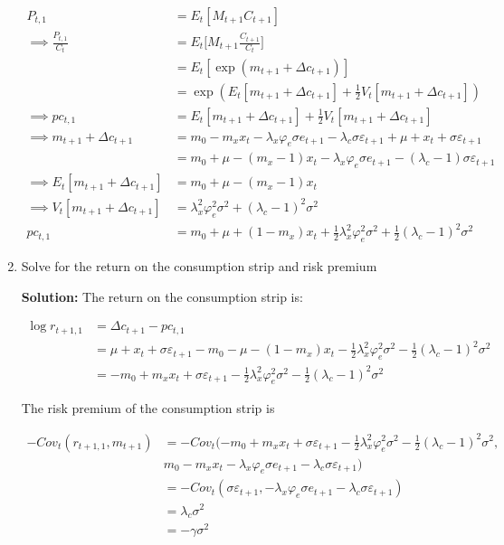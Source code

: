 \documentclass{article}
\begin{document}
\begin{enumerate}
\begin{align*}
P_{t,1} &= E_t[M_{t+1} C_{t+1}]\\
\implies
\frac{P_{t,1}}{C_t} &= E_t \Bigg[M_{t+1} \frac{C_{t+1}}{C_t} \Bigg]\\
&= E_t [\exp(m_{t+1} + \Delta c_{t+1} ) ]\\
&= \exp(E_t [m_{t+1} + \Delta c_{t+1} ] + \frac{1}{2} V_t[m_{t+1} + \Delta c_{t+1} ])\\
\implies
pc_{t,1} &= E_t [m_{t+1} + \Delta c_{t+1} ] + \frac{1}{2} V_t[m_{t+1} + \Delta c_{t+1} ] \\
\implies
m_{t+1} + \Delta c_{t+1} 
&= m_0 - m_x x_t -\lambda_x \varphi_e \sigma e_{t+1} - \lambda_c \sigma \varepsilon_{t+1} + \mu + x_t + \sigma \varepsilon_{t+1}\\
&= m_0 + \mu - (m_x -1)x_t -\lambda_x \varphi_e \sigma e_{t+1} - (\lambda_c - 1) \sigma \varepsilon_{t+1}\\
\implies
E_t [m_{t+1} + \Delta c_{t+1} ] 
&= m_0 + \mu - (m_x -1)x_t \\
\implies
V_t [m_{t+1} + \Delta c_{t+1} ]
&=\lambda_x^2 \varphi_e^2 \sigma^2 + (\lambda_c - 1)^2 \sigma^2 \\
pc_{t,1} &= m_0 + \mu + (1 - m_x)x_t + \frac{1}{2} \lambda_x^2 \varphi_e^2 \sigma^2 + \frac{1}{2}(\lambda_c - 1)^2 \sigma^2 
\end{align*}

\pagebreak

\item Solve for the return on the consumption strip and risk premium

\bigskip

\textbf{Solution:} The return on the consumption strip is:

\begin{align*}
\log r_{t+1,1} 
&= \Delta c_{t+1} - pc_{t,1} \\
&= \mu + x_t + \sigma \varepsilon_{t+1} - m_0 - \mu - (1 - m_x)x_t - \frac{1}{2} \lambda_x^2 \varphi_e^2 \sigma^2 - \frac{1}{2}(\lambda_c - 1)^2 \sigma^2\\
&=  - m_0 + m_x x_t + \sigma \varepsilon_{t+1}  - \frac{1}{2} \lambda_x^2 \varphi_e^2 \sigma^2 - \frac{1}{2}(\lambda_c - 1)^2 \sigma^2
\end{align*}

The risk premium of the consumption strip is

\begin{align*}
-Cov_t(r_{t+1, 1}, m_{t+1}) 
&= -Cov_t(- m_0 + m_x x_t + \sigma \varepsilon_{t+1}  - \frac{1}{2} \lambda_x^2 \varphi_e^2 \sigma^2 - \frac{1}{2}(\lambda_c - 1)^2 \sigma^2, \\& m_0 - m_x x_t -\lambda_x \varphi_e \sigma e_{t+1} - \lambda_c \sigma \varepsilon_{t+1})\\
&= -Cov_t( \sigma \varepsilon_{t+1}  , -\lambda_x \varphi_e \sigma e_{t+1} - \lambda_c \sigma \varepsilon_{t+1}) \\
&= \lambda_c \sigma^2 \\
&= -\gamma \sigma^2
\end{align*}


\end{enumerate}
\end{document}
